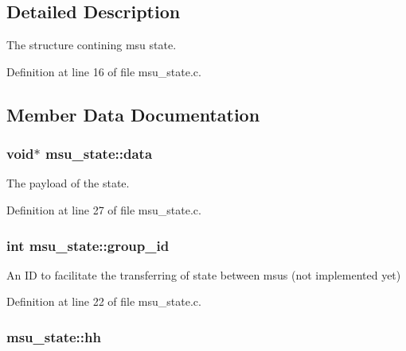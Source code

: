 \subsection{Detailed Description}
The structure contining msu state. 

Definition at line 16 of file msu\-\_\-state.\-c.



\subsection{Member Data Documentation}
\hypertarget{structmsu__state_a7c6d1548878fbcafa7f359f05303b8b3}{
\subsubsection[{data}]{\setlength{\rightskip}{0pt plus 5cm}void$\ast$ msu\-\_\-state\-::data}}\label{structmsu__state_a7c6d1548878fbcafa7f359f05303b8b3}


The payload of the state. 



Definition at line 27 of file msu\-\_\-state.\-c.

\hypertarget{structmsu__state_aced19bc311412983eef344487d088895}{
\subsubsection[{group\-\_\-id}]{\setlength{\rightskip}{0pt plus 5cm}int msu\-\_\-state\-::group\-\_\-id}}\label{structmsu__state_aced19bc311412983eef344487d088895}


An I\-D to facilitate the transferring of state between msus (not implemented yet) 



Definition at line 22 of file msu\-\_\-state.\-c.

\hypertarget{structmsu__state_a07301d57260c6fb15ee1c2f8abab45dd}{
\subsubsection[{hh}]{ msu\-\_\-state\-::hh}}\label{structmsu__state_a07301d57260c6fb15ee1c2f8abab45dd}


